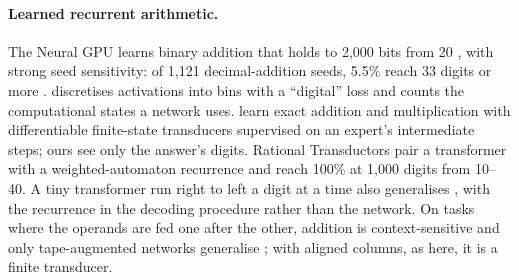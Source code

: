 \documentclass[11pt]{article}
\begin{document}
\paragraph{Learned recurrent arithmetic.} The Neural GPU learns binary addition that holds to
2{,}000 bits from 20 \citep{kaiser-2015-neural-gpu}, with strong seed sensitivity: of 1{,}121
decimal-addition seeds, 5.5\% reach 33 digits or more \citep{price-2016-neural-gpu-extensions-limitations}.
\citet{robinson-2020-extrapolating-algorithmic-learning} discretises activations into bins with a
``digital'' loss and counts the computational states a network uses.
\citet{papazov-2025-exact-learning-arithmetic-differentiable-agents} learn exact addition and
multiplication with differentiable finite-state transducers supervised on an expert's intermediate
steps; ours see only the answer's digits. Rational Transductors
\citep{mohri-2026-rational-transductors} pair a transformer with a weighted-automaton recurrence
and reach 100\% at 1{,}000 digits from 10--40. A tiny transformer run right to left a digit at a time
also generalises \citep{patriota-2024-arbitrary-length-addition-tiny-transformer}, with the
recurrence in the decoding procedure rather than the network. On tasks where the operands are fed
one after the other, addition is context-sensitive and only tape-augmented networks generalise
\citep{deletang-2022-neural-networks-chomsky-hierarchy}; with aligned columns, as here, it is a
finite transducer.
\end{document}
